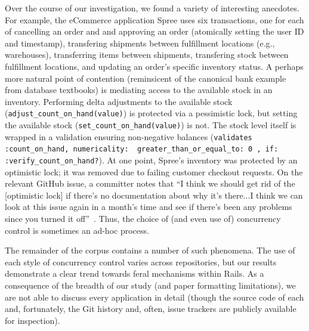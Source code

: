 Over the course of our investigation, we found a variety of
interesting anecdotes. For example, the eCommerce application Spree
uses six transactions, one for each of cancelling an order and and
approving an order (atomically setting the user ID and timestamp),
transfering shipments between fulfillment locations (e.g.,
warehouses), transferring items between shipments, transfering stock
between fulfillment locations, and updating an order's specific
inventory status. A perhaps more natural point of contention
(reminsicent of the canonical bank example from database textbooks) is
mediating access to the available stock in an inventory. Performing
delta adjustments to the available stock
(\texttt{adjust\_count\_on\_hand(value)}) is protected via a
pessimistic lock, but setting the available stock
(\texttt{set\_count\_on\_hand(value)}) is not. The stock level itself
is wrapped in a validation ensuring non-negative balances
(\texttt{validates :count\_on\_hand, numericality: {
    greater\_than\_or\_equal\_to: 0 }, if:
  :verify\_count\_on\_hand?}). At one point, Spree's inventory was
protected by an optimistic lock; it was removed due to failing
customer checkout requests. On the relevant GitHub issue, a committer
notes that ``I think we should get rid of the [optimistic lock] if
there's no documentation about why it's there...I think we can look at
this issue again in a month's time and see if there's been any
problems since you turned it off''~\cite{code-optimistic-issue}. Thus,
the choice of (and even use of) concurrency control is sometimes an
ad-hoc process.

The remainder of the corpus contains a number of such phenomena. The
use of each style of concurrency control varies across repositories,
but our results demonstrate a clear trend towards feral mechanisms
within Rails. As a consequence of the breadth of our study (and paper
formatting limitations), we are not able to discuss every application
in detail (though the source code of each and, fortunately, the Git
history and, often, issue trackers are publicly available for
inspection).


